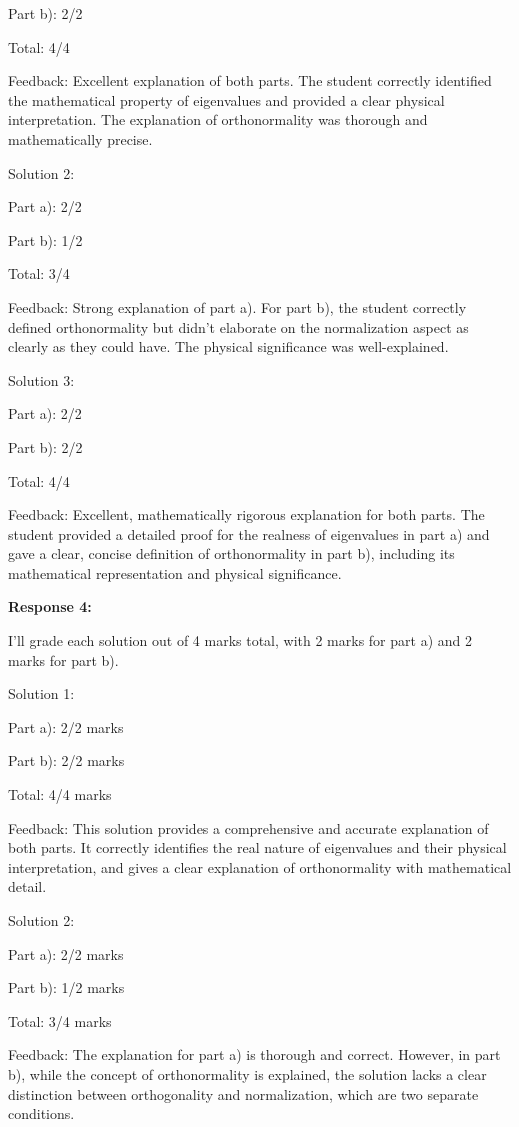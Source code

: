 \documentclass[a4paper,11pt]{article}
\begin{document}
Part b): 2/2

Total: 4/4

Feedback: Excellent explanation of both parts. The student correctly identified the mathematical property of eigenvalues and provided a clear physical interpretation. The explanation of orthonormality was thorough and mathematically precise.

Solution 2:

Part a): 2/2

Part b): 1/2

Total: 3/4

Feedback: Strong explanation of part a). For part b), the student correctly defined orthonormality but didn't elaborate on the normalization aspect as clearly as they could have. The physical significance was well-explained.

Solution 3:

Part a): 2/2

Part b): 2/2

Total: 4/4

Feedback: Excellent, mathematically rigorous explanation for both parts. The student provided a detailed proof for the realness of eigenvalues in part a) and gave a clear, concise definition of orthonormality in part b), including its mathematical representation and physical significance.

\bigskip   
\textbf{Response 4:}

I'll grade each solution out of 4 marks total, with 2 marks for part a) and 2 marks for part b).

Solution 1:

Part a): 2/2 marks

Part b): 2/2 marks

Total: 4/4 marks

Feedback: This solution provides a comprehensive and accurate explanation of both parts. It correctly identifies the real nature of eigenvalues and their physical interpretation, and gives a clear explanation of orthonormality with mathematical detail.

Solution 2:

Part a): 2/2 marks

Part b): 1/2 marks

Total: 3/4 marks

Feedback: The explanation for part a) is thorough and correct. However, in part b), while the concept of orthonormality is explained, the solution lacks a clear distinction between orthogonality and normalization, which are two separate conditions.
\end{document}
